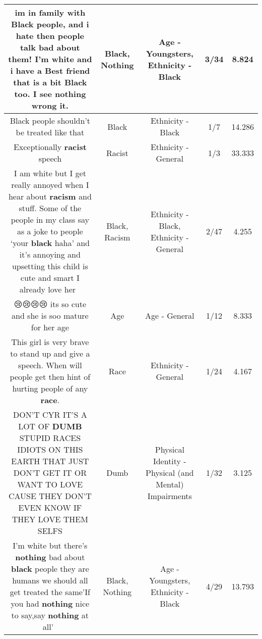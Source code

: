 \documentclass[11pt]{article}
\newlength\mylength
\begin{document}
\begin{center}
\begin{longtable}{|C{.65\mylength}|C{.30\mylength}|C{.12\mylength}|C{.12\mylength}|C{.12\mylength}|}
  \small im in family with \textbf{Black} people, and i hate then people talk bad about them! I'm white and i have a Best friend that is a bit \textbf{Black} too. I see \textbf{nothing} wrong it.\normalsize   & Black, Nothing & Age - Youngsters, Ethnicity - Black & 3/34 & 8.824 \\  \hline
  \small Black people shouldn't be treated like that\normalsize   & Black & Ethnicity - Black & 1/7 & 14.286 \\  \hline
  \small Exceptionally \textbf{racist} speech\normalsize   & Racist & Ethnicity - General & 1/3 & 33.333 \\  \hline
  \small I am white but I get really annoyed when I hear about \textbf{racism} and stuff. Some of the people in my class say as a joke to people ‘your \textbf{black} haha' and it's annoying and upsetting this child is cute and smart I already love her 🙂\normalsize   & Black, Racism & Ethnicity - Black, Ethnicity - General & 2/47 & 4.255 \\  \hline
  \small 😢😢😢😢 its so cute and she is soo mature for her age\normalsize   & Age & Age - General & 1/12 & 8.333 \\  \hline
  \small This girl is very brave to stand up and give a speech. When will people get then hint of hurting people of any \textbf{race}.\normalsize   & Race & Ethnicity - General & 1/24 & 4.167 \\  \hline
  \small DON'T CYR  IT'S A LOT OF \textbf{DUMB} STUPID RACES IDIOTS ON THIS EARTH THAT JUST DON'T GET IT OR WANT TO LOVE CAUSE THEY DON'T EVEN KNOW IF THEY LOVE THEM SELFS\normalsize   & Dumb & Physical Identity - Physical (and Mental) Impairments & 1/32 & 3.125 \\  \hline
  \small I'm white but there's \textbf{nothing} bad about \textbf{black} people they are humans we should all get treated the same'If you had \textbf{nothing} nice to say,say \textbf{nothing} at all'~\normalsize   & Black, Nothing & Age - Youngsters, Ethnicity - Black & 4/29 & 13.793 \\  \hline

\end{longtable}
\end{center}
\end{document}
